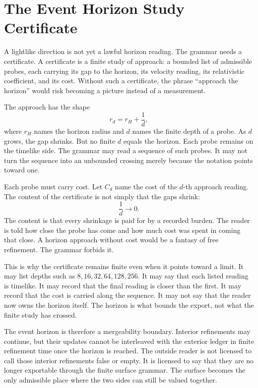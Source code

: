 \section{The Event Horizon Study Certificate}

A lightlike direction is not yet a lawful horizon reading. The grammar needs
a certificate. A certificate is a finite study of approach: a bounded list
of admissible probes, each carrying its gap to the horizon, its velocity
reading, its relativistic coefficient, and its cost. Without such a
certificate, the phrase ``approach the horizon'' would risk becoming a
picture instead of a measurement.

The approach has the shape
\[
  r_d = r_H + \frac{1}{d},
\]
where \(r_H\) names the horizon radius and \(d\) names the finite depth of a
probe. As \(d\) grows, the gap shrinks. But no finite \(d\) equals the
horizon. Each probe remains on the timelike side. The grammar may read a
sequence of such probes. It may not turn the sequence into an unbounded
crossing merely because the notation points toward one.

Each probe must carry cost. Let \(C_d\) name the cost of the \(d\)-th
approach reading. The content of the certificate is not simply that the
gaps shrink:
\[
  \frac{1}{d} \to 0.
\]
The content is that every shrinkage is paid for by a recorded burden. The
reader is told how close the probe has come and how much cost was spent in
coming that close. A horizon approach without cost would be a fantasy of
free refinement. The grammar forbids it.

This is why the certificate remains finite even when it points toward a
limit. It may list depths such as \(8,16,32,64,128,256\). It may say that
each listed reading is timelike. It may record that the final reading is
closer than the first. It may record that the cost is carried along the
sequence. It may not say that the reader now owns the horizon itself. The
horizon is what bounds the export, not what the finite study has crossed.

The event horizon is therefore a mergeability boundary. Interior
refinements may continue, but their updates cannot be interleaved with the
exterior ledger in finite refinement time once the horizon is reached. The
outside reader is not licensed to call those interior refinements false or
empty. It is licensed to say that they are no longer exportable through the
finite surface grammar. The surface becomes the only admissible place where
the two sides can still be valued together.

